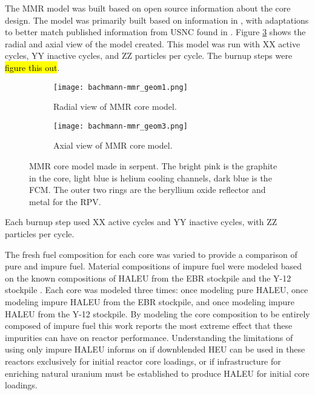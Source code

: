 The \gls{MMR} model was built based on open source information 
about the core design. The model was primarily built based on 
information in \cite{hawari_development_2018}, with adaptations to 
better match published information from \gls{USNC} found in 
\cite{noauthor_usnc_2021}. Figure \ref{fig:mmr_core} shows the radial 
and axial view of the model created. This model was run with XX active 
cycles, YY inactive cycles, and ZZ particles per cycle. The burnup steps
were \hl{figure this out}.

\begin{figure}
    \centering 
    \begin{subfigure}{0.45\textwidth}
        \centering 
        \texttt{[image: bachmann-mmr\_geom1.png]}
        \caption{Radial view of MMR core model.}
        \label{fig:mmr_core_radial}        
    \end{subfigure}
    \hfill
    \begin{subfigure}{0.45\textwidth}
        \centering 
        \texttt{[image: bachmann-mmr\_geom3.png]}
        \caption{Axial view of MMR core model.}
        \label{fig:mmr_core_axial}        
    \end{subfigure}
    \caption{MMR core model made in serpent. The bright pink is the 
    graphite in the core, light blue is helium cooling channels, 
    dark blue is the FCM. The outer two rings are the 
    beryllium oxide reflector and metal for the RPV.}
    \label{fig:mmr_core}
\end{figure}

 Each burnup step 
used XX active cycles and YY inactive cycles, with ZZ particles per 
cycle. 




The fresh fuel composition for each core was varied to provide 
a comparison of pure and impure fuel.
Material compositions of impure fuel were modeled based on the 
known compositions of \gls{HALEU} from the \gls{EBR} stockpile 
\cite{vaden_isotopic_2018} and the Y-12 stockpile \cite{nelson_foreign_2010}.
Each core was modeled three times: once modeling pure \gls{HALEU}, 
once modeling impure \gls{HALEU} from the \gls{EBR} stockpile, and once 
modeling impure \gls{HALEU} from the Y-12 stockpile.
By modeling the core composition to be entirely composed of impure fuel 
this work reports the most extreme effect that these impurities can 
have on reactor performance. Understanding the limitations of using only 
impure \gls{HALEU} informs on if downblended \gls{HEU} can be used in 
these reactors exclusively for initial reactor core loadings, or if 
infrastructure for enriching natural uranium must be established to 
produce \gls{HALEU} for initial core loadings. 

